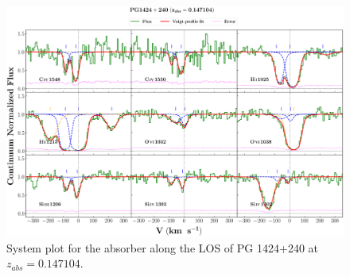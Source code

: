   
  \newpage
  \thispagestyle{empty}
  
  \begin{landscape}
  
      \begin{figure}
      \centering
      \vspace{-10mm}
      \hspace*{-20mm}
      \includegraphics[width=1.1\linewidth]{System-Plots/PG1424+240_z=0.147104_sys_plot.png}
      \caption{System plot for the absorber along the LOS of PG 1424+240 at $z_{abs} = 0.147104$. }
      \end{figure}
      
  \end{landscape}
  
